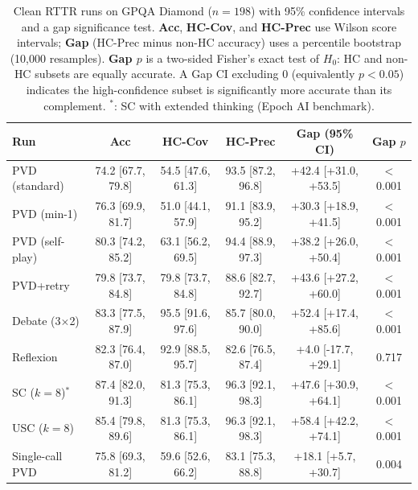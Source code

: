 \begin{table}[h]
\centering
\caption{Clean RTTR runs on GPQA Diamond ($n{=}198$) with 95\% confidence intervals and a gap significance test. \textbf{Acc}, \textbf{HC-Cov}, and \textbf{HC-Prec} use Wilson score intervals; \textbf{Gap} (HC-Prec minus non-HC accuracy) uses a percentile bootstrap (10{,}000 resamples). \textbf{Gap $p$} is a two-sided Fisher's exact test of $H_0$: HC and non-HC subsets are equally accurate. A Gap CI excluding 0 (equivalently $p<0.05$) indicates the high-confidence subset is significantly more accurate than its complement. $^*$: SC with extended thinking (Epoch AI benchmark).}
\label{tab:rttr-stats}
\small
\setlength{\tabcolsep}{4pt}
\begin{tabular}{lccccc}
\toprule
\textbf{Run} & \textbf{Acc} & \textbf{HC-Cov} & \textbf{HC-Prec} & \textbf{Gap (95\% CI)} & \textbf{Gap $p$} \\
\midrule
PVD (standard) & 74.2 [67.7, 79.8] & 54.5 [47.6, 61.3] & 93.5 [87.2, 96.8] & +42.4 [+31.0, +53.5] & $<$0.001 \\
PVD (min-1) & 76.3 [69.9, 81.7] & 51.0 [44.1, 57.9] & 91.1 [83.9, 95.2] & +30.3 [+18.9, +41.5] & $<$0.001 \\
PVD (self-play) & 80.3 [74.2, 85.2] & 63.1 [56.2, 69.5] & 94.4 [88.9, 97.3] & +38.2 [+26.0, +50.4] & $<$0.001 \\
PVD+retry & 79.8 [73.7, 84.8] & 79.8 [73.7, 84.8] & 88.6 [82.7, 92.7] & +43.6 [+27.2, +60.0] & $<$0.001 \\
Debate (3$\times$2) & 83.3 [77.5, 87.9] & 95.5 [91.6, 97.6] & 85.7 [80.0, 90.0] & +52.4 [+17.4, +85.6] & $<$0.001 \\
Reflexion & 82.3 [76.4, 87.0] & 92.9 [88.5, 95.7] & 82.6 [76.5, 87.4] & +4.0 [-17.7, +29.1] & 0.717 \\
SC ($k{=}8$)$^*$ & 87.4 [82.0, 91.3] & 81.3 [75.3, 86.1] & 96.3 [92.1, 98.3] & +47.6 [+30.9, +64.1] & $<$0.001 \\
USC ($k{=}8$) & 85.4 [79.8, 89.6] & 81.3 [75.3, 86.1] & 96.3 [92.1, 98.3] & +58.4 [+42.2, +74.1] & $<$0.001 \\
Single-call PVD & 75.8 [69.3, 81.2] & 59.6 [52.6, 66.2] & 83.1 [75.3, 88.8] & +18.1 [+5.7, +30.7] & 0.004 \\
\bottomrule
\end{tabular}
\end{table}
